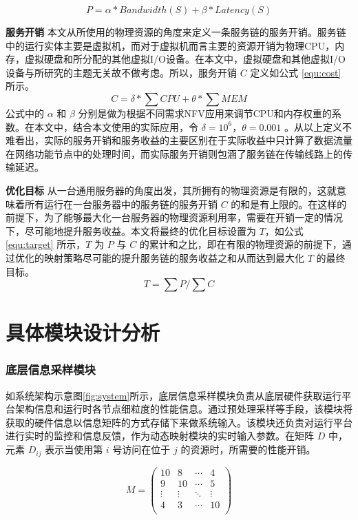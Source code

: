 \begin{equation}
\label{equ:profit}
P = \alpha*Bandwidth(S) + \beta* Latency(S)
\end{equation}

\textbf{服务开销}{ }本文从所使用的物理资源的角度来定义一条服务链的服务开销。服务链中的运行实体主要是虚拟机，而对于虚拟机而言主要的资源开销为物理CPU，内存，虚拟硬盘和所分配的其他虚拟I/O设备。在本文中，虚拟硬盘和其他虚拟I/O设备与所研究的主题无关故不做考虑。所以，服务开销 $C$ 定义如公式 \ref{equ:cost} 所示。
\begin{equation}
\label{equ:cost}
C = \delta * \sum{CPU} + \theta *\sum{MEM} 
\end{equation}
公式中的 $\alpha$ 和 $\beta$ 分别是做为根据不同需求NFV应用来调节CPU和内存权重的系数。在本文中，结合本文使用的实际应用，令 $\delta = 10^{6}$，$\theta = 0.001$ 。从以上定义不难看出，实际的服务开销和服务收益的主要区别在于实际收益中只计算了数据流量在网络功能节点中的处理时间，而实际服务开销则包涵了服务链在传输线路上的传输延迟。

\textbf{优化目标}{ }从一台通用服务器的角度出发，其所拥有的物理资源是有限的，这就意味着所有运行在一台服务器中的服务链的服务开销 $C$ 的和是有上限的。在这样的前提下，为了能够最大化一台服务器的物理资源利用率，需要在开销一定的情况下，尽可能地提升服务收益。本文将最终的优化目标设置为 $T$，如公式 \ref{equ:target} 所示，$T$ 为 $P$ 与 $C$ 的累计和之比，即在有限的物理资源的前提下，通过优化的映射策略尽可能的提升服务链的服务收益之和从而达到最大化 $T$ 的最终目标。
\begin{equation}
\label{equ:target}
T = \sum P / \sum C  
\end{equation}

\section{具体模块设计分析}
\subsubsection{底层信息采样模块}
如系统架构示意图\ref{fig:system}所示，底层信息采样模块负责从底层硬件获取运行平台架构信息和运行时各节点细粒度的性能信息。通过预处理采样等手段，该模块将获取的硬件信息以信息矩阵的方式存储下来做系统输入。该模块还负责对运行平台进行实时的监控和信息反馈，作为动态映射模块的实时输入参数。在矩阵 $D$ 中，元素 $D_{ij}$ 表示当使用第 $i$ 号访问在位于 $j$ 的资源时，所需要的性能开销。

$$
M =
\begin{pmatrix}
10      & 8      & \cdots & 4      \\
9      & 10      & \cdots & 5      \\
\vdots & \vdots & \ddots & \vdots \\
4      & 3      & \cdots & 10     \\
\end{pmatrix}
$$



